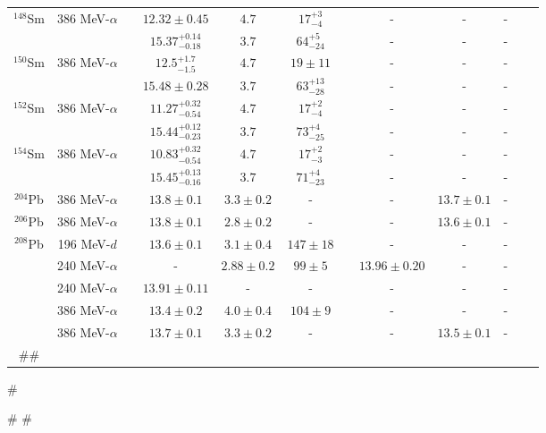 \begin{table}[t!]
{\begin{tabular}{@{}cccccccccc@{}cc}
$^{148}$Sm & 386 MeV-$\alpha$ & & $12.32\pm0.45$& $4.7$ & ${17}^{+3}_{-4}$ & & - & - & - & & \cite{Itoh_prc2003} \\
  & & & ${15.37}^{+0.14}_{-0.18}$ & $3.7$ & ${64}^{+5}_{-24}$ & & - & - & - & & \cite{Itoh_prc2003} \\
$^{150}$Sm & 386 MeV-$\alpha$ & & ${12.5}^{+1.7}_{-1.5}$& $4.7$ & $19\pm11$ & & - & - & - & & \cite{Itoh_prc2003} \\
  & & & $15.48 \pm 0.28$ & $3.7$ & ${63}^{+13}_{-28}$ & & - & - & - & & \cite{Itoh_prc2003} \\
$^{152}$Sm & 386 MeV-$\alpha$ & & ${11.27}^{+0.32}_{-0.54}$ & $4.7$ & ${17}^{+2}_{-4}$ & & - & - & - & & \cite{Itoh_prc2003} \\
  & & & ${15.44}^{+0.12}_{-0.23}$ & $3.7$ & ${73}^{+4}_{-25}$ & & - & - & - & & \cite{Itoh_prc2003} \\
$^{154}$Sm & 386 MeV-$\alpha$ & & ${10.83}^{+0.32}_{-0.54}$& $4.7$ & ${17}^{+2}_{-3}$ & & - & - & - & & \cite{Itoh_prc2003} \\
  & & & ${15.45}^{+0.13}_{-0.16}$ & $3.7$ & ${71}^{+4}_{-23}$ & & - & - & - & & \cite{Itoh_prc2003} \\
$^{204}$Pb & 386 MeV-$\alpha$ & & $13.8\pm0.1$ & $3.3\pm0.2$ & - & & - & $13.7\pm0.1$ & - & & \cite{Darshana2013} \\
$^{206}$Pb & 386 MeV-$\alpha$ & & $13.8\pm0.1$ & $2.8\pm0.2$ & - & & - & $13.6\pm0.1$ & - & &  \cite{Darshana2013} \\
$^{208}$Pb & 196 MeV-$d$ & & $13.6\pm0.1$ & $3.1\pm0.4$ & $147\pm18$ & & - & - & - & & \cite{Darshana2015} \\
  & 240 MeV-$\alpha$ & & - & $2.88\pm0.2$ & $99\pm 5$ & & $13.96\pm 0.20$ & - & - & & \cite{dhybg} \\
  & 240 MeV-$\alpha$ & & $13.91\pm0.11$ & - & - & & - & - & - & & \cite{dhyprl} \\
  & 386 MeV-$\alpha$ & & $13.4\pm0.2$ & $4.0\pm0.4$ & $104\pm9$ & & - & - & - & & \cite{Uchida_90Zr} \\
  & 386 MeV-$\alpha$ & & $13.7\pm0.1$ & $3.3\pm0.2$ & - & & - & $13.5\pm0.1$ & - & & \cite{Darshana2013} \\
#\bottomrule[0.1ex]
#\end{tabular}
#}
#\label{ISGMR-table}
#\end{table}